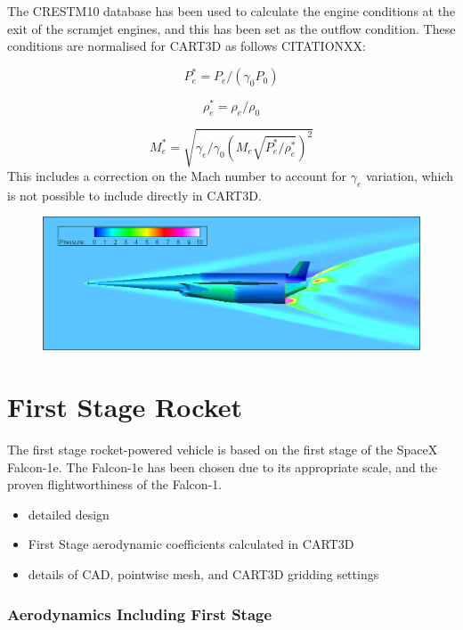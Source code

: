 The CRESTM10 database has been used to calculate the engine conditions at the exit of the scramjet engines, and this has been set as the outflow condition. These conditions are normalised for CART3D as follows CITATIONXX:

\begin{equation}
P_e^* = P_e/(\gamma_0 P_0)
\end{equation}

\begin{equation}
\rho_e^* = \rho_e/\rho_0
\end{equation}

\begin{equation}
M_e^* = \sqrt{\gamma_e/\gamma_0 (M_e \sqrt{ P_e^*/\rho_e^*})^2}
\end{equation}
This includes a correction on the Mach number to account for $\gamma_e$ variation, which is not possible to include directly in CART3D\cite{Mehta2016}.

\begin{figure}
	\centering
	\includegraphics[width=0.9\linewidth]{figures/3_vehicle_design/EngineOn-M7AoA024km}
	\caption{}
	\label{fig:EngineOn-M7AoA624km}
\end{figure}


\section{First Stage Rocket}
The first stage rocket-powered vehicle is based on the first stage of the SpaceX Falcon-1e. The Falcon-1e has been chosen due to its appropriate scale, and the proven flightworthiness of the Falcon-1.

\begin{itemize}
	\item detailed design
	\item First Stage aerodynamic coefficients calculated in CART3D
	\item details of CAD, pointwise mesh, and CART3D gridding settings
\end{itemize}


  \subsubsection{Aerodynamics Including First Stage}

